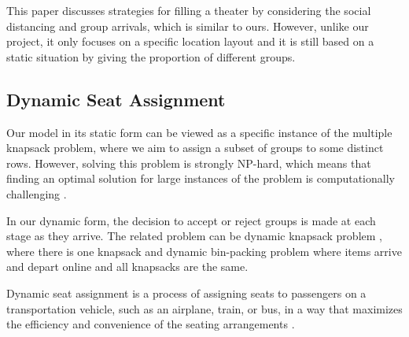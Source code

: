 This paper \cite{blom2022filling} discusses strategies for filling a theater by considering the social distancing and group arrivals, which is similar to ours. However, unlike our project, it only focuses on a specific location layout and it is still based on a static situation by giving the proportion of different groups.





\subsection{Dynamic Seat Assignment}
Our model in its static form can be viewed as a specific instance of the multiple knapsack problem, where we aim to assign a subset of groups to some distinct rows. However, solving this problem is strongly NP-hard, which means that finding an optimal solution for large instances of the problem is computationally challenging \cite{pisinger1999exact}.

In our dynamic form, the decision to accept or reject groups is made at each stage as they arrive.
The related problem can be dynamic knapsack problem \cite{kleywegt1998dynamic}, where there is one knapsack and dynamic bin-packing problem \cite{coffman1983dynamic, berndt2020fully} where items arrive and depart online and all knapsacks are the same. 


Dynamic seat assignment is a process of assigning seats to passengers on a transportation vehicle, such as an airplane, train, or bus, in a way that maximizes the efficiency and convenience of the seating arrangements \cite{hamdouch2011schedule, berge1993demand, zhu2023assign}. 

